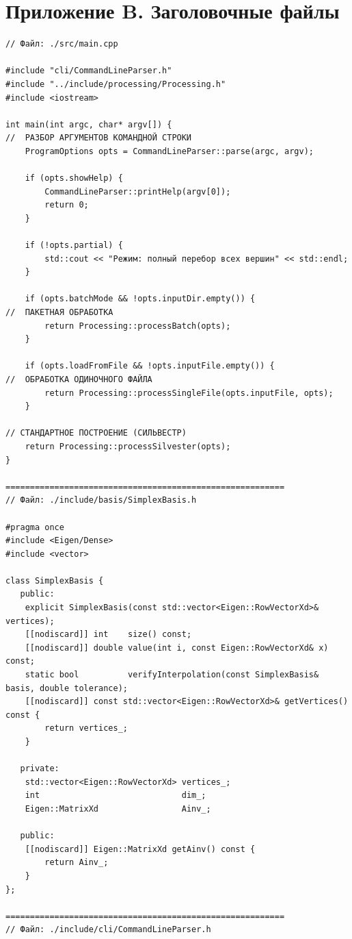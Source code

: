 \documentclass[appendix_B]{subfiles}
\begin{document}
\section*{Приложение B. Заголовочные файлы}
\begin{lstlisting}
// Файл: ./src/main.cpp

#include "cli/CommandLineParser.h"
#include "../include/processing/Processing.h"
#include <iostream>

int main(int argc, char* argv[]) {
//  РАЗБОР АРГУМЕНТОВ КОМАНДНОЙ СТРОКИ
    ProgramOptions opts = CommandLineParser::parse(argc, argv);

    if (opts.showHelp) {
        CommandLineParser::printHelp(argv[0]);
        return 0;
    }

    if (!opts.partial) {
        std::cout << "Режим: полный перебор всех вершин" << std::endl;
    }

    if (opts.batchMode && !opts.inputDir.empty()) {
//  ПАКЕТНАЯ ОБРАБОТКА
        return Processing::processBatch(opts);
    }

    if (opts.loadFromFile && !opts.inputFile.empty()) {
//  ОБРАБОТКА ОДИНОЧНОГО ФАЙЛА
        return Processing::processSingleFile(opts.inputFile, opts);
    }

// СТАНДАРТНОЕ ПОСТРОЕНИЕ (СИЛЬВЕСТР)
    return Processing::processSilvester(opts);
}

=========================================================
// Файл: ./include/basis/SimplexBasis.h

#pragma once
#include <Eigen/Dense>
#include <vector>

class SimplexBasis {
   public:
    explicit SimplexBasis(const std::vector<Eigen::RowVectorXd>& vertices);
    [[nodiscard]] int    size() const;
    [[nodiscard]] double value(int i, const Eigen::RowVectorXd& x) const;
    static bool          verifyInterpolation(const SimplexBasis& basis, double tolerance);
    [[nodiscard]] const std::vector<Eigen::RowVectorXd>& getVertices() const {
        return vertices_;
    }

   private:
    std::vector<Eigen::RowVectorXd> vertices_;
    int                             dim_;
    Eigen::MatrixXd                 Ainv_;

   public:
    [[nodiscard]] Eigen::MatrixXd getAinv() const {
        return Ainv_;
    }
};

=========================================================
// Файл: ./include/cli/CommandLineParser.h


\end{lstlisting}
\end{document}
